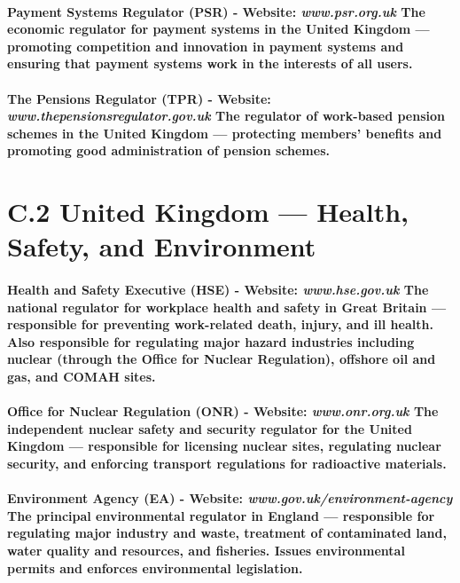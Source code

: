 \paragraph{\textbf{Payment Systems Regulator (PSR)} - Website: \textit{www.psr.org.uk} The economic regulator for payment systems in the United Kingdom — promoting competition and innovation in payment systems and ensuring that payment systems work in the interests of all users.}
\paragraph{\textbf{The Pensions Regulator (TPR)} - Website: \textit{www.thepensionsregulator.gov.uk} The regulator of work-based pension schemes in the United Kingdom — protecting members' benefits and promoting good administration of pension schemes.}

\section*{C.2 United Kingdom — Health, Safety, and Environment}
\paragraph{\textbf{Health and Safety Executive (HSE)} - Website: \textit{www.hse.gov.uk} The national regulator for workplace health and safety in Great Britain — responsible for preventing work-related death, injury, and ill health. Also responsible for regulating major hazard industries including nuclear (through the Office for Nuclear Regulation), offshore oil and gas, and COMAH sites.}
\paragraph{\textbf{Office for Nuclear Regulation (ONR)} - Website: \textit{www.onr.org.uk} The independent nuclear safety and security regulator for the United Kingdom — responsible for licensing nuclear sites, regulating nuclear security, and enforcing transport regulations for radioactive materials.}
\paragraph{\textbf{Environment Agency (EA)} - Website: \textit{www.gov.uk/environment-agency} The principal environmental regulator in England — responsible for regulating major industry and waste, treatment of contaminated land, water quality and resources, and fisheries. Issues environmental permits and enforces environmental legislation.}
